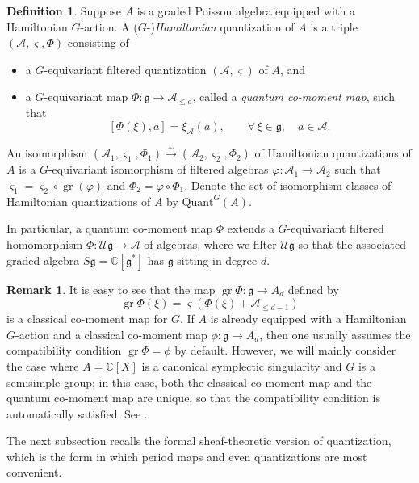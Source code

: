\documentclass[11pt, a4paper]{amsart}
\newcommand{\C}{\mathbb{C}}
\newcommand{\g}{\mathfrak{g}}
\newcommand{\gr}{\operatorname{gr}}
\newcommand{\fg}{\mathfrak{g}}
\newcommand{\cA}{\mathcal{A}}
\newcommand{\cU}{\mathcal{U}}
\newcommand{\Ug}{\cU\fg}
\theoremstyle{definition}
\newtheorem{defi}[Thm]{Definition}
\newtheorem{Rem}[Thm]{Remark}
\numberwithin{equation}{section}
\begin{document}
\begin{defi}\label{defn:hamiltonian}
Suppose $A$ is a graded Poisson algebra equipped with a Hamiltonian $G$-action. A ($G$-)\emph{Hamiltonian} quantization of $A$ is a triple $(\cA,\varsigma,\Phi)$ consisting of
 \begin{itemize}
     \item[(i)] a $G$-equivariant filtered quantization $(\cA,\varsigma)$ of $A$, and
     \item[(ii)] a $G$-equivariant map $\Phi: \fg \to \cA_{\leq d}$, called a \emph{quantum co-moment map}, such that
     \[[\Phi(\xi), a] = \xi_{\cA}(a), \qquad \forall\,\xi \in \fg, \quad a \in \cA.\]
 \end{itemize}
 An isomorphism $(\cA_1,\varsigma_1,\Phi_1) \xrightarrow{\sim} (\cA_2,\varsigma_2,\Phi_2)$ of Hamiltonian quantizations of $A$ is a $G$-equivariant isomorphism of filtered algebras $\varphi: \cA_1 \to \cA_2$ such that $\varsigma_1 = \varsigma_2 \circ \gr(\varphi)$ and $\Phi_2 = \varphi \circ \Phi_1$. Denote the set of isomorphism classes of Hamiltonian quantizations of $A$ by $\mathrm{Quant}^G(A)$.
\end{defi}

In particular, a quantum co-moment map $\Phi$ extends a $G$-equivariant filtered homomorphism $\Phi: \Ug \to \cA$ of algebras, where we filter $\Ug$ so that the associated graded algebra $S\fg = \C[\fg^*]$ has $\g$ sitting in degree $d$.

\begin{Rem}
	It is easy to see that the map $\gr\Phi: \fg \to A_d$ defined by 
	\[
		\gr\Phi(\xi) = \varsigma(\Phi(\xi) + \cA_{\leqslant d-1})
	\]
	is a classical co-moment map for $G$. If $A$ is already equipped with a Hamiltonian $G$-action and a classical co-moment map $\phi: \g \to A_d$, then one usually assumes the compatibility condition $\gr\Phi = \phi$ by default. However, we will mainly consider the case where $A=\C[X]$ is a canonical symplectic singularity and $G$ is a semisimple group; in this case, both the classical co-moment map and the quantum co-moment map are unique, so that the compatibility condition is automatically satisfied. See .
\end{Rem}

The next subsection recalls the formal sheaf-theoretic version of quantization, which is the form in which period maps and even quantizations are most convenient.
\end{document}
